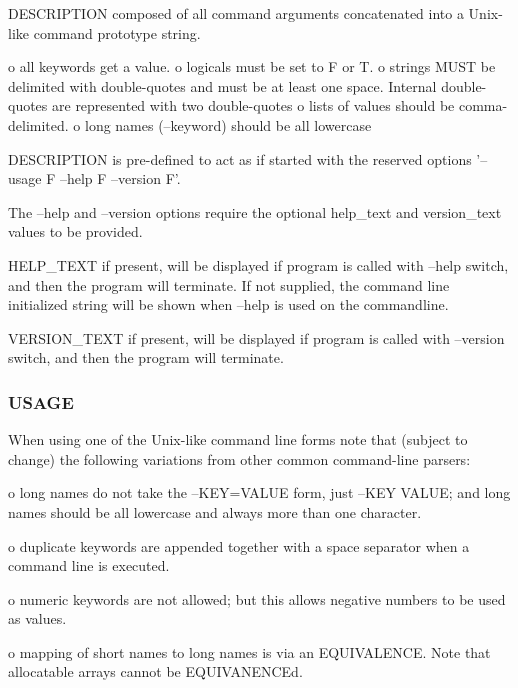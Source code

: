 \begin{DoxyVerb}  DESCRIPTION   composed of all command arguments concatenated
                into a Unix-like command prototype string.

                o all keywords get a value.
                o logicals must be set to F or T.
                o strings MUST be delimited with double-quotes and
                  must be at least one space. Internal
                  double-quotes are represented with two double-quotes
                o lists of values should be comma-delimited.
                o long names (--keyword) should be all lowercase

                DESCRIPTION is pre-defined to act as if started with the
                reserved options '--usage F --help F --version F'.

                The --help and --version options require the optional
                help_text and version_text values to be provided.

  HELP_TEXT     if present, will be displayed if program is called with
                --help switch, and then the program will terminate. If
                not supplied, the command line initialized string will be
                shown when --help is used on the commandline.

  VERSION_TEXT  if present, will be displayed if program is called with
                --version switch, and then the program will terminate.
\end{DoxyVerb}


\subsubsection*{U\+S\+A\+GE}

When using one of the Unix-\/like command line forms note that (subject to change) the following variations from other common command-\/line parsers\+:

o long names do not take the --K\+EY=V\+A\+L\+UE form, just --K\+EY V\+A\+L\+UE; and long names should be all lowercase and always more than one character.

o duplicate keywords are appended together with a space separator when a command line is executed.

o numeric keywords are not allowed; but this allows negative numbers to be used as values.

o mapping of short names to long names is via an E\+Q\+U\+I\+V\+A\+L\+E\+N\+CE. Note that allocatable arrays cannot be E\+Q\+U\+I\+V\+A\+N\+E\+N\+C\+Ed.

